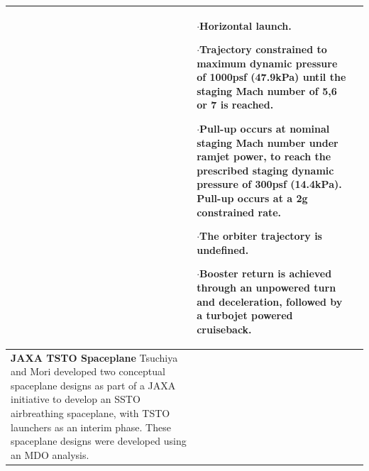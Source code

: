 {\begin{landscape}
\begin{xltabular}{\linewidth}{|X|X|X|}
	
	&\small
	
	$\cdot$Horizontal launch.
	
	$\cdot$Trajectory constrained to maximum dynamic pressure of 1000psf (47.9kPa) until the staging Mach number of 5,6 or 7 is reached. 
	
	$\cdot$Pull-up occurs at nominal staging Mach number under ramjet power, to reach the prescribed staging dynamic pressure of 300psf (14.4kPa). Pull-up occurs at a 2g constrained rate. 
	
	$\cdot$The orbiter trajectory is undefined.
	
	$\cdot$Booster return is achieved through an unpowered turn and deceleration, followed by a turbojet powered cruiseback. 
	\\
	
	
	\hline \small 
	\textbf{JAXA TSTO Spaceplane}\cite{Tsuchiya2005}\newline\newline
	Tsuchiya and Mori\cite{Tsuchiya2005} developed two conceptual spaceplane designs as part of a JAXA initiative to develop an SSTO airbreathing spaceplane, with TSTO launchers as an interim phase. These spaceplane designs were developed using an MDO analysis. 
	&\small
	

\end{xltabular}
\end{landscape}}
